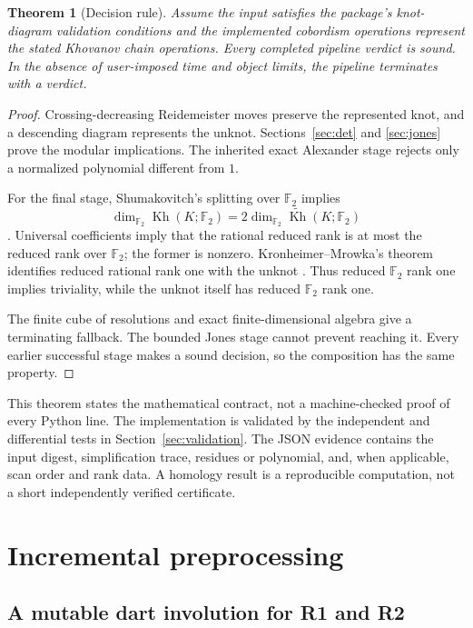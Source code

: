 \documentclass[11pt]{article}
\newtheorem{theorem}{Theorem}[section]
\theoremstyle{remark}\newtheorem{remark}[theorem]{Remark}
\newcommand{\F}{\mathbb F}
\newcommand{\Kh}{\operatorname{Kh}}
\newcommand{\rKh}{\widetilde{\operatorname{Kh}}}
\begin{document}
\begin{theorem}[Decision rule]
Assume the input satisfies the package's knot-diagram validation conditions
and the implemented cobordism operations represent the stated Khovanov chain
operations. Every completed pipeline verdict is sound. In the absence of
user-imposed time and object limits, the pipeline terminates with a verdict.
\end{theorem}
\begin{proof}
Crossing-decreasing Reidemeister moves preserve the represented knot, and a
descending diagram represents the unknot. Sections~\ref{sec:det} and
\ref{sec:jones} prove the modular implications. The inherited exact Alexander
stage rejects only a normalized polynomial different from $1$.

For the final stage, Shumakovitch's splitting over $\F_2$ implies
\[
 \dim_{\F_2}\Kh(K;\F_2)=2\dim_{\F_2}\rKh(K;\F_2)
\]
\cite[Corollary 3.2.C]{shumakovitch}. Universal coefficients imply that the
rational reduced rank is at most the reduced rank over $\F_2$; the former
is nonzero. Kronheimer--Mrowka's theorem identifies reduced rational rank
one with the unknot \cite{kronheimer-mrowka}. Thus reduced $\F_2$ rank one
implies triviality, while the unknot itself has reduced $\F_2$ rank one.

The finite cube of resolutions and exact finite-dimensional algebra give a
terminating fallback. The bounded Jones stage cannot prevent reaching it.
Every earlier successful stage makes a sound decision, so the composition
has the same property.
\end{proof}

This theorem states the mathematical contract, not a machine-checked proof
of every Python line. The implementation is validated by the independent
and differential tests in Section~\ref{sec:validation}. The JSON evidence
contains the input digest, simplification trace, residues or polynomial,
and, when applicable, scan order and rank data. A homology result is a
reproducible computation, not a short independently verified certificate.

\section{Incremental preprocessing}
\label{sec:preprocessing}

\subsection{A mutable dart involution for R1 and R2}
\end{document}
